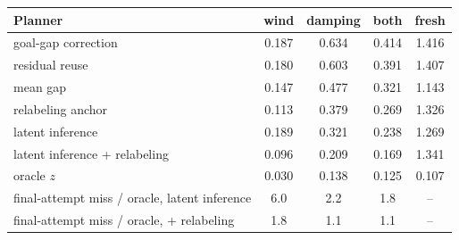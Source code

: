 \begin{tabular}{lcccc}
\toprule
Planner & wind & damping & both & fresh \\
\midrule
goal-gap correction & 0.187 & 0.634 & 0.414 & 1.416 \\
residual reuse & 0.180 & 0.603 & 0.391 & 1.407 \\
mean gap & 0.147 & 0.477 & 0.321 & 1.143 \\
relabeling anchor & 0.113 & 0.379 & 0.269 & 1.326 \\
latent inference & 0.189 & 0.321 & 0.238 & 1.269 \\
latent inference + relabeling & 0.096 & 0.209 & 0.169 & 1.341 \\
oracle $z$ & 0.030 & 0.138 & 0.125 & 0.107 \\
\midrule
final-attempt miss / oracle, latent inference & 6.0 & 2.2 & 1.8 & -- \\
final-attempt miss / oracle, + relabeling & 1.8 & 1.1 & 1.1 & -- \\
\bottomrule
\end{tabular}
